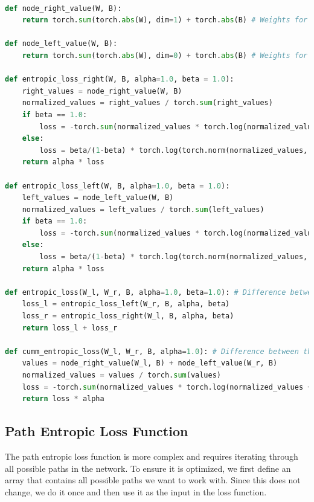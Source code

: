 \documentclass[12pt]{article}
\begin{document}
\begin{lstlisting}[language=Python,caption={Entropic Compactifier Loss Function}]

def node_right_value(W, B):
    return torch.sum(torch.abs(W), dim=1) + torch.abs(B) # Weights for the incoming connections (node to the right)

def node_left_value(W, B):
    return torch.sum(torch.abs(W), dim=0) + torch.abs(B) # Weights for the outgoing connections (node to the left)

def entropic_loss_right(W, B, alpha=1.0, beta = 1.0):
    right_values = node_right_value(W, B)
    normalized_values = right_values / torch.sum(right_values)
    if beta == 1.0:
        loss = -torch.sum(normalized_values * torch.log(normalized_values + 1e-10))
    else:
        loss = beta/(1-beta) * torch.log(torch.norm(normalized_values, p=beta) + 1e-10)
    return alpha * loss

def entropic_loss_left(W, B, alpha=1.0, beta = 1.0):
    left_values = node_left_value(W, B)
    normalized_values = left_values / torch.sum(left_values)
    if beta == 1.0:
        loss = -torch.sum(normalized_values * torch.log(normalized_values + 1e-10))
    else:
        loss = beta/(1-beta) * torch.log(torch.norm(normalized_values, p=beta) + 1e-10)
    return alpha * loss

def entropic_loss(W_l, W_r, B, alpha=1.0, beta=1.0): # Difference between this and cumm_entropic_loss is that this one computes the loss for both left and right nodes separately
    loss_l = entropic_loss_left(W_r, B, alpha, beta)
    loss_r = entropic_loss_right(W_l, B, alpha, beta)
    return loss_l + loss_r

def cumm_entropic_loss(W_l, W_r, B, alpha=1.0): # Difference between this and entropic_loss is that this one assigns the node weight from the left and right before computing the loss
    values = node_right_value(W_l, B) + node_left_value(W_r, B)
    normalized_values = values / torch.sum(values)
    loss = -torch.sum(normalized_values * torch.log(normalized_values + 1e-10))  # Add small constant to avoid log(0)
    return loss * alpha

\end{lstlisting}

\subsection{Path Entropic Loss Function}
The path entropic loss function is more complex and requires iterating through all possible paths in the network. To ensure it is optimized, we first define an array that contains all possible paths we want to work with. Since this does not change, we do it once and then use it as the input in the loss function.
\end{document}

